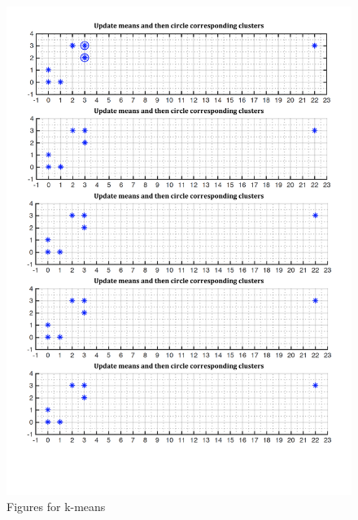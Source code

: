\begin{enumerate}
\begin{figure}[th!]
  \centering
  \includegraphics[scale=0.8]{images/blank.pdf}
  \caption{Figures for k-means}\label{fig:kmeans}
\end{figure}
\end{enumerate}



  
